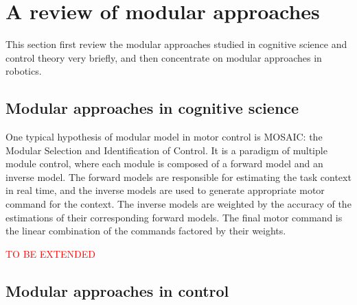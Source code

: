 \section{A review of modular approaches}
\label{cha2:sec3:modular}
This section first review the modular approaches studied in cognitive science and control theory very briefly, and then concentrate on modular approaches in robotics. 

\subsection{Modular approaches in cognitive science}
\label{cha2:sec3:modular:ai}

One typical hypothesis of modular model in motor control is MOSAIC: the Modular Selection and Identification of Control. It is a paradigm of multiple module control, where each module is composed of a forward model and an inverse model. The forward models are responsible for estimating the task context in real time, and the inverse models are used to generate appropriate motor command for the context. The inverse models are weighted by the accuracy of the estimations of their corresponding forward models. The final motor command is the linear combination of the commands factored by their weights.

\textcolor{red}{TO BE EXTENDED}

\subsection{Modular approaches in control}
\label{cha2:sec3:modular:control}

